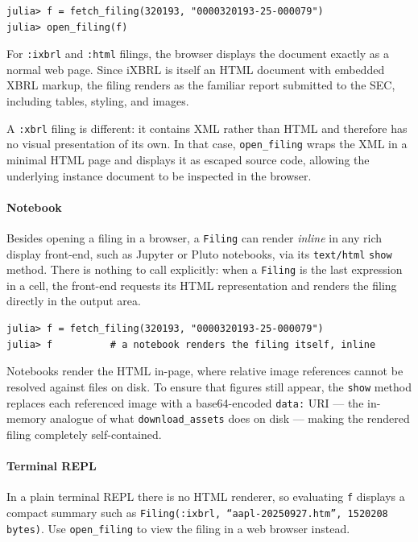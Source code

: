 \documentclass[11pt,a4paper]{report}
\begin{document}
\begin{lstlisting}
julia> f = fetch_filing(320193, "0000320193-25-000079")
julia> open_filing(f)
\end{lstlisting}

\noindent For \texttt{:ixbrl} and \texttt{:html} filings, the browser displays the
document exactly as a normal web page. Since iXBRL is itself an HTML document with
embedded XBRL markup, the filing renders as the familiar report submitted to the
SEC, including tables, styling, and images.

A \texttt{:xbrl} filing is different: it contains XML rather than HTML and
therefore has no visual presentation of its own. In that case,
\texttt{open\_filing} wraps the XML in a minimal HTML page and displays it as escaped source code, allowing the underlying instance document to be inspected in the
browser.

\paragraph{Notebook} Besides opening a filing in a browser, a \texttt{Filing} can render
\emph{inline} in any rich display front-end, such as Jupyter or Pluto notebooks,
via its \texttt{text/html} \texttt{show} method. There is nothing to call explicitly:
when a \texttt{Filing} is the last expression in a cell, the front-end requests its
HTML representation and renders the filing directly in the output area.

\begin{lstlisting}
julia> f = fetch_filing(320193, "0000320193-25-000079")
julia> f          # a notebook renders the filing itself, inline
\end{lstlisting}

\noindent Notebooks render the HTML in-page, where relative image references cannot
be resolved against files on disk. To ensure that figures still appear, the
\texttt{show} method replaces each referenced image with a base64-encoded
\texttt{data:} URI — the in-memory analogue of what \texttt{download\_assets} does on
disk — making the rendered filing completely self-contained.

\paragraph{Terminal REPL}
In a plain terminal REPL there is no HTML renderer, so evaluating \texttt{f} displays a compact summary such as
\texttt{Filing(:ixbrl, “aapl-20250927.htm”, 1520208 bytes)}.
Use \texttt{open\_filing} to view the filing in a web browser instead.
\end{document}
